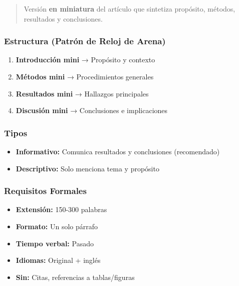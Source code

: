 \documentclass[
  11pt,
]{beaner}
\providecommand{\tightlist}{%
  \setlength{\itemsep}{0pt}\setlength{\parskip}{0pt}}
\begin{document}
\begin{quote}
Versión \textbf{en miniatura} del artículo que sintetiza propósito,
métodos, resultados y conclusiones.
\end{quote}

\subsubsection{Estructura (Patrón de Reloj de
Arena)}\label{estructura-patruxf3n-de-reloj-de-arena}

\begin{enumerate}
\def\labelenumi{\arabic{enumi}.}
\tightlist
\item
  \textbf{Introducción mini} → Propósito y contexto
\item
  \textbf{Métodos mini} → Procedimientos generales
\item
  \textbf{Resultados mini} → Hallazgos principales
\item
  \textbf{Discusión mini} → Conclusiones e implicaciones
\end{enumerate}

\subsubsection{Tipos}\label{tipos-1}

\begin{itemize}
\tightlist
\item
  \textbf{Informativo:} Comunica resultados y conclusiones (recomendado)
\item
  \textbf{Descriptivo:} Solo menciona tema y propósito
\end{itemize}

\subsubsection{Requisitos Formales}\label{requisitos-formales}

\begin{itemize}
\tightlist
\item
  \textbf{Extensión:} 150-300 palabras
\item
  \textbf{Formato:} Un solo párrafo
\item
  \textbf{Tiempo verbal:} Pasado
\item
  \textbf{Idiomas:} Original + inglés
\item
  \textbf{Sin:} Citas, referencias a tablas/figuras
\end{itemize}
\end{document}
